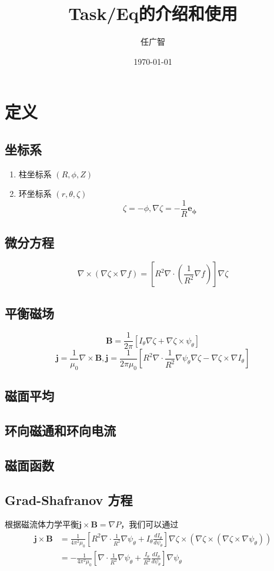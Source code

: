 \documentclass[11pt,a4paper]{article}
\title{Task/Eq的介绍和使用}
\author{任广智}
\date{\today}
\begin{document}
	
	\maketitle
	
	\section{定义}
	\subsection{坐标系}
	
	\begin{enumerate}
		\item 柱坐标系 $(R,\phi,Z)$
		\item 环坐标系 $(r,\theta,\zeta)$
			$$\zeta = -\phi, \nabla\zeta = -\frac{1}{R}\pmb{e_\phi}$$
	\end{enumerate}
	
	\subsection{微分方程}
	$$ \nabla\times(\nabla\zeta\times\nabla{f})=[R^2\nabla\cdot(\frac{1}{R^2}\nabla{f})]\nabla\zeta $$
	$$  $$
	
	\subsection{平衡磁场}
	$$ \pmb{B}=\frac{1}{2\pi}[I_\theta\nabla\zeta+\nabla\zeta\times\psi_\theta] $$
	$$ \pmb{j}=\frac{1}{\mu_0}\nabla\times\pmb{B}, \pmb{j}=\frac{1}{2\pi\mu_0}[R^2\nabla\cdot\frac{1}{R^2}\nabla\psi_\theta\nabla\zeta-\nabla\zeta\times\nabla{I_\theta}] $$
	
	\subsection{磁面平均}
	
	\subsection{环向磁通和环向电流}
	
	\subsection{磁面函数}
	
	
	\subsection{Grad-Shafranov 方程}
	根据磁流体力学平衡$\pmb{j}\times\pmb{B}=\nabla{P}$，我们可以通过
	$$  
	\begin{aligned}
	\pmb{j}\times\pmb{B}
	&=\frac{1}{4\pi^2\mu_0}[R^2\nabla\cdot\frac{1}{R^2}\nabla\psi_\theta+I_\theta\frac{dI_\theta}{d\psi_\theta}]\nabla\zeta\times(\nabla\zeta\times(\nabla\zeta\times\nabla\psi_\theta))\\
	&=-\frac{1}{4\pi^2\mu_0}[\nabla\cdot\frac{1}{R^2}\nabla\psi_\theta+\frac{I_\theta}{R^2}\frac{dI_\theta}{d\psi_\theta}]\nabla\psi_\theta
	\end{aligned}
	$$
	
\end{document}
